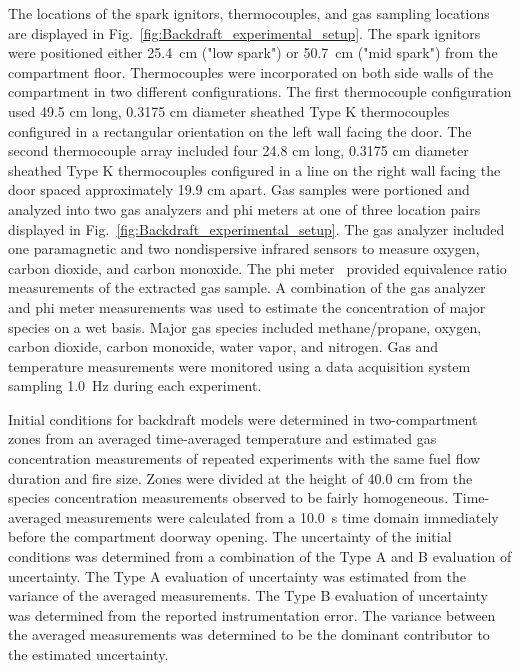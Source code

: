\documentclass[12pt,letterpaper]{article}
\begin{document}
\begin{flushleft}
The locations of the spark ignitors, thermocouples, and gas sampling locations are displayed in Fig.~\ref{fig:Backdraft_experimental_setup}. The spark ignitors were positioned either 25.4~cm ("low spark") or 50.7~cm ("mid spark") from the compartment floor. Thermocouples were incorporated on both side walls of the compartment in two different configurations. The first thermocouple configuration used 49.5 cm long, 0.3175 cm diameter sheathed Type K thermocouples configured in a rectangular orientation on the left wall facing the door. The second thermocouple array included four 24.8 cm long, 0.3175 cm diameter sheathed Type K thermocouples configured in a line on the right wall facing the door spaced approximately 19.9 cm apart. Gas samples were portioned and analyzed into two gas analyzers and phi meters at one of three location pairs displayed in Fig.~\ref{fig:Backdraft_experimental_setup}. The gas analyzer included one paramagnetic and two nondispersive infrared sensors to measure oxygen, carbon dioxide, and carbon monoxide. The phi meter~\cite{babrauskas1994phi,Falkenstein2021a} provided equivalence ratio measurements of the extracted gas sample. A combination of the gas analyzer and phi meter measurements was used to estimate the concentration of major species on a wet basis. Major gas species included methane/propane, oxygen, carbon dioxide, carbon monoxide, water vapor, and nitrogen. Gas and temperature measurements were monitored using a data acquisition system sampling 1.0~Hz during each experiment.

Initial conditions for backdraft models were determined in two-compartment zones from an averaged time-averaged temperature and estimated gas concentration measurements of repeated experiments with the same fuel flow duration and fire size. Zones were divided at the height of 40.0 cm from the species concentration measurements observed to be fairly homogeneous. Time-averaged measurements were calculated from a 10.0~s time domain immediately before the compartment doorway opening. The uncertainty of the initial conditions was determined from a combination of the Type A and B evaluation of uncertainty. The Type A evaluation of uncertainty was estimated from the variance of the averaged measurements. The Type B evaluation of uncertainty was determined from the reported instrumentation error. The variance between the averaged measurements was determined to be the dominant contributor to the estimated uncertainty.


\end{flushleft}
\end{document}
